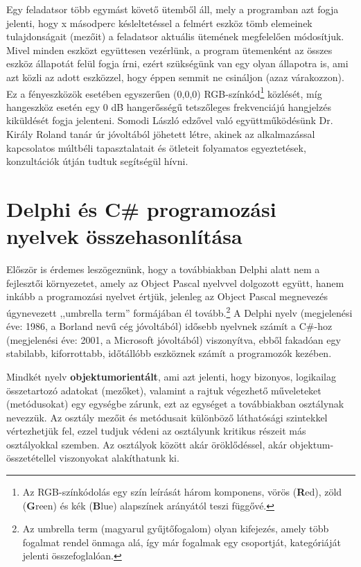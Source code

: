 \documentclass[tocnopagenum]{thesis-ekf}
\begin{document}
	Egy feladatsor több egymást követő ütemből áll, mely a programban azt fogja jelenti, hogy x másodperc késleltetéssel a felmért eszköz tömb elemeinek tulajdonságait (mezőit) a feladatsor aktuális ütemének megfelelően módosítjuk. Mivel minden eszközt együttesen vezérlünk, a program ütemenként az összes eszköz állapotát felül fogja írni, ezért szükségünk van egy olyan állapotra is, ami azt közli az adott eszközzel, hogy éppen semmit ne csináljon (azaz várakozzon). Ez a fényeszközök esetében egyszerűen (0,0,0) RGB-színkód\footnote{Az RGB-színkódolás egy szín leírását három komponens, vörös (\textbf{R}ed), zöld (\textbf{G}reen) és kék (\textbf{B}lue) alapszínek arányától teszi függővé.} közlését, míg hangeszköz esetén egy 0 dB hangerősségű tetszőleges frekvenciájú hangjelzés kiküldését fogja jelenteni.
	Somodi László edzővel való együttműködésünk Dr. Király Roland tanár úr jóvoltából jöhetett létre, akinek az alkalmazással kapcsolatos múltbéli tapasztalatait és  ötleteit folyamatos egyeztetések, konzultációk útján tudtuk segítségül hívni.
	\section{Delphi és C\# programozási nyelvek összehasonlítása}
	Először is érdemes leszögeznünk, hogy a továbbiakban Delphi alatt nem a fejlesztői környezetet, amely az Object Pascal nyelvvel dolgozott együtt, hanem inkább a programozási nyelvet értjük, jelenleg az Object Pascal megnevezés úgynevezett ,,umbrella term'' formájában él tovább.\footnote{Az umbrella term (magyarul gyűjtőfogalom) olyan kifejezés, amely több fogalmat rendel önmaga alá, így már fogalmak egy csoportját, kategóriáját jelenti összefoglalóan.} \cite{sof_delphi}
	A Delphi nyelv (megjelenési éve: 1986, a Borland nevű cég jóvoltából) idősebb nyelvnek számít a C\#-hoz (megjelenési éve: 2001, a Microsoft 
	jóvoltából) viszonyítva, ebből fakadóan egy stabilabb, kiforrottabb, időtállóbb eszköznek számít a programozók kezében. 
	
	Mindkét nyelv \textbf{objektumorientált}, ami azt jelenti, hogy bizonyos, logikailag összetartozó adatokat (mezőket), valamint a rajtuk végezhető műveleteket (metódusokat) egy egységbe zárunk, ezt az egységet a továbbiakban osztálynak nevezzük. Az osztály mezőit és metódusait különböző láthatósági szintekkel vértezhetjük fel, ezzel tudjuk védeni az osztályunk kritikus részeit más osztályokkal szemben. Az osztályok között akár öröklődéssel, akár objektum-összetétellel viszonyokat alakíthatunk ki.
	
\end{document}
